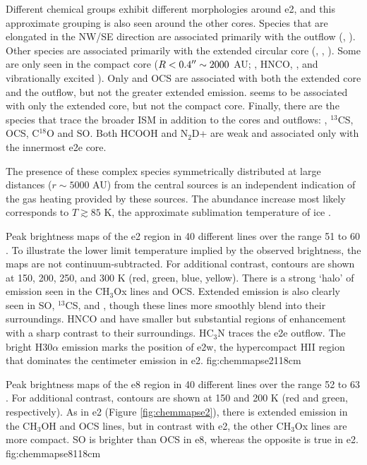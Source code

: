 \documentclass{emulateapj}
\begin{document}
Different chemical groups exhibit different morphologies around e2, and this
approximate grouping is also seen around the other cores.  Species that are
elongated in the NW/SE direction are associated primarily with the outflow
(\cyanoacetylene, \ethylcyanide).  Other species are associated primarily with
the extended circular core (\methylformate, \dimethylether, \acetone).  Some
are only seen in the compact core ($R<0.4\mbox{$^{\prime\prime}$}\sim2000$ AU;
\methyleneamidogen, HNCO, \formamide, and vibrationally excited
\cyanoacetylene).  Only \methanol and OCS are associated with both the extended
core and the outflow, but not the greater extended emission.  \ketene seems to
be associated with only the extended core, but not the compact core. Finally,
there are the species that trace the broader ISM in addition to the cores and
outflows: \formaldehyde, $^{13}$CS, OCS, C$^{18}$O and SO.  Both HCOOH and
N$_2$D+ are weak and associated only with the innermost e2e core.

The presence of these complex species symmetrically distributed at large
distances ($r\sim5000$ AU) from the central sources is an independent
indication of the gas heating provided by these sources.  The abundance
increase most likely corresponds to $T\gtrsim85$ K, the approximate
sublimation temperature of \methanol ice \citep{Green2009a}.


{Peak brightness maps of the e2 region in 40 different lines over the range 51 to 60
\kms.  To illustrate the lower limit temperature implied by the observed brightness,
the maps are not continuum-subtracted.  
For additional contrast, contours are shown at 150, 200, 250, and 300 K
(red, green, blue, yellow).
There
is a strong `halo' of emission seen in the CH$_3$Ox lines and OCS.  Extended
emission is also clearly seen in SO, $^{13}$CS, and \formaldehyde, though these
lines more smoothly blend into their surroundings.  HNCO and \formamide have
smaller but substantial regions of enhancement with a sharp contrast to their
surroundings.  HC$_3$N traces the e2e outflow.  The bright H30$\alpha$ emission
marks the position of e2w, the hypercompact HII region that dominates the
centimeter emission in e2.
}{fig:chemmapse2}{1}{18cm}

{Peak brightness maps of the e8 region in 40 different lines over the range 52 to 63
\kms.
For additional contrast, contours are shown at 150 and 200 K
(red and green, respectively).
As in e2 (Figure \ref{fig:chemmapse2}),
there is extended emission in the CH$_3$OH and OCS lines, but in contrast with e2,
the other CH$_3$Ox lines are more compact. SO is brighter than OCS in e8, 
whereas the opposite is true in e2.
}{fig:chemmapse8}{1}{18cm}
\end{document}

